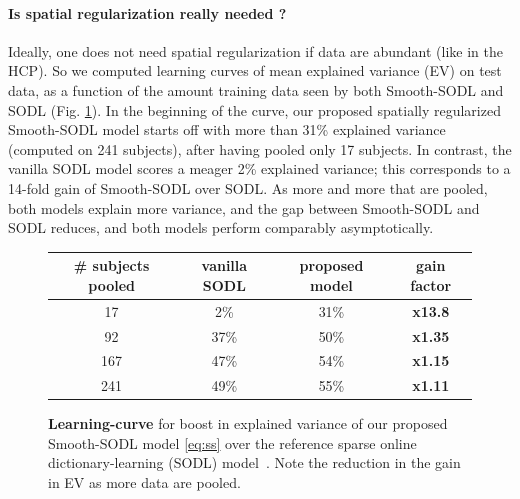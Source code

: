         
\paragraph{Is spatial regularization really needed ?}
Ideally, one does not need spatial regularization if data are abundant (like in the HCP). So we computed learning curves of mean explained variance (EV) on test data, as a function of the amount training data seen by both Smooth-SODL and SODL   \citep{mairal2010} (Fig. \ref{fig:ev}).
In the beginning of the curve, our proposed spatially regularized Smooth-SODL model starts off with more than 31\% explained variance (computed on 241 subjects), after having pooled only 17 subjects. In contrast, the vanilla SODL model   \citep{mairal2010} scores a meager 2\% explained variance; this corresponds  to a 14-fold gain of Smooth-SODL over SODL. As more and more that are pooled, both models explain more variance, and the gap between Smooth-SODL and SODL reduces, and both models perform comparably asymptotically. %

\begin{figure}[!htp]
 \begin{tabular}{c|c|c|c}\hline%
    {\# subjects pooled} & {vanilla SODL} & {proposed model} & {gain factor} \\ \hline
17 & {2\%} & {31\%} & \bf{x13.8}\\\hline
92 & 37\% & {50\%} & \bf{x1.35}\\\hline
167 & 47\% & {54\%} & \bf{x1.15}\\\hline
241 & 49\% & {55\%} & \bf{x1.11}\\
  \end{tabular}
 \caption{\textbf{Learning-curve} for boost in explained variance of our proposed Smooth-SODL model \eqref{eq:ss} 
over the reference sparse online dictionary-learning (SODL) model~\citep{mairal2010}.
   Note the reduction in the gain in EV as more data are pooled.}
 \label{fig:ev}
\end{figure}



